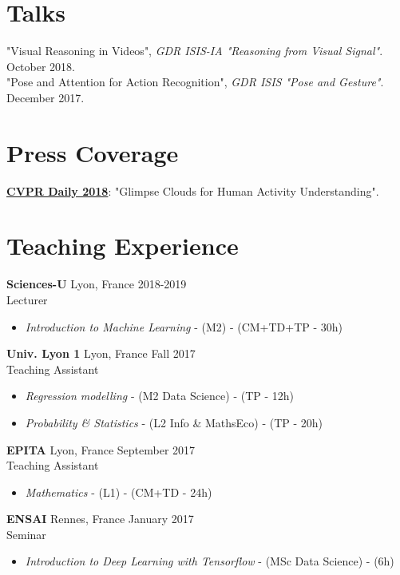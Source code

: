 \documentclass[10pt]{res} %
\begin{document}
\begin{resume}

\section{\large Talks}
"Visual Reasoning in Videos",  \textit{GDR ISIS-IA "Reasoning from Visual Signal"}. October 2018. \\
"Pose and Attention for Action Recognition", \textit{GDR ISIS "Pose and Gesture"}. December 2017.


\section{\large Press Coverage}
\href{https://www.rsipvision.com/CVPR2018-Tuesday/14/}{\textbf{CVPR Daily 2018}}: "Glimpse Clouds for Human Activity Understanding".

\section{\large Teaching Experience}
\textbf{Sciences-U} \hfill Lyon, France \hfill 2018-2019 \\
Lecturer
\begin{itemize}
	\item \textit{Introduction to Machine Learning} - (M2) - (CM+TD+TP - 30h)
\end{itemize}

\textbf{Univ. Lyon 1} \hfill Lyon, France \hfill Fall 2017 \\
Teaching Assistant
\begin{itemize}
	\item \textit{Regression modelling}  - (M2 Data Science) - (TP - 12h)
	\item \textit{Probability \& Statistics}  - (L2 Info \& MathsEco) - (TP - 20h)
\end{itemize}

\textbf{EPITA} \hfill Lyon, France \hfill September 2017 \\
Teaching Assistant
\begin{itemize}
	\item \textit{Mathematics} - (L1) - (CM+TD - 24h)
\end{itemize}

\textbf{ENSAI} \hfill Rennes, France \hfill January 2017 \\
Seminar
\begin{itemize}
\item \textit{Introduction to Deep Learning with Tensorflow} - (MSc Data Science) - (6h)
\end{itemize}


\end{resume}
\end{document}
